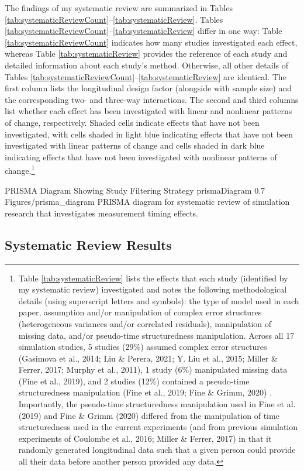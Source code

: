 \documentclass[
12pt, %
twoside,
english]{guelphthesis}
\theoremstyle{definition}
\theoremstyle{definition}
\theoremstyle{definition}
\theoremstyle{definition}
\theoremstyle{remark}
\begin{document}
The findings of my systematic review are summarized in Tables \ref{tab:systematicReviewCount}--\ref{tab:systematicReview}. Tables \ref{tab:systematicReviewCount}--\ref{tab:systematicReview} differ in one way: Table \ref{tab:systematicReviewCount} indicates how many studies investigated each effect, whereas Table \ref{tab:systematicReview} provides the reference of each study and detailed information about each study's method. Otherwise, all other details of Tables \ref{tab:systematicReviewCount}--\ref{tab:systematicReview} are identical. The first column lists the longitudinal design factor (alongside with sample size) and the corresponding two- and three-way interactions. The second and third columns list whether each effect has been investigated with linear and nonlinear patterns of change, respectively. Shaded cells indicate effects that have not been investigated, with cells shaded in light blue indicating effects that have not been investigated with linear patterns of change and cells shaded in dark blue indicating effects that have not been investigated with nonlinear patterns of change.\footnote{Table \ref{tab:systematicReview} lists the effects that each study (identified by my systematic review) investigated and notes the following methodological details (using superscript letters and symbols): the type
of model used in each paper, assumption and/or manipulation of complex error structures
(heterogeneous variances and/or correlated residuals), manipulation of missing data,
and/or pseudo-time structuredness manipulation. Across all 17 simulation studies, 5 studies (29\%) assumed complex error structures (Gasimova et al., 2014; Liu \& Perera, 2021; Y. Liu et al., 2015; Miller \& Ferrer, 2017; Murphy et al., 2011), 1 study (6\%) manipulated missing data (Fine et al., 2019), and 2 studies (12\%) contained a pseudo-time structuredness manipulation (Fine et al., 2019; Fine \& Grimm, 2020) . Importantly, the pseudo-time structuredness manipulation used in Fine et al. (2019) and Fine \& Grimm (2020) differed from the manipulation of time
structuredness used in the current experiments (and from previous simulation experiments of Coulombe et al., 2016; Miller \& Ferrer, 2017) in that it randomly generated longitudinal data such that a given person could provide all their data before another person provided any data.}
\begin{apaFigure}
[landscape]
{PRISMA Diagram Showing Study Filtering Strategy}
{prismaDiagram}
{0.7}
{Figures/prisma_diagram}
{PRISMA diagram for systematic review of simulation research that investigates measurement timing effects.}
\end{apaFigure}
\hypertarget{systematic-review-results}{%
\subsection{Systematic Review Results}\label{systematic-review-results}}
\end{document}
